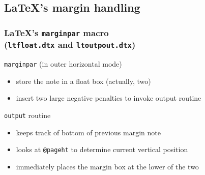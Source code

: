 \documentclass{beamer}
\def\cs#1{\texttt{\expandafter\string\csname#1\endcsname}}
\begin{document}
\subsection{\protect\LaTeX's margin handling}
\begin{frame}
  \frametitle{\LaTeX's \cs{marginpar} macro\\\normalsize
  (\texttt{ltfloat.dtx} and \texttt{ltoutpout.dtx})}
  \begin{block}{\cs{marginpar} (in outer horizontal mode)}
    \begin{itemize}
    \item store the note in a float box (actually, two)
    \item insert two large negative penalties to invoke output routine
    \end{itemize}
  \end{block}
  \begin{block}{\cs{output} routine}
    \begin{itemize}
    \item keeps track of bottom of previous margin note
    \item looks at \cs{@pageht} to determine current vertical position
    \item immediately places the margin box at the lower of the two
    \end{itemize}
  \end{block}
\end{frame}
 
\end{document}
